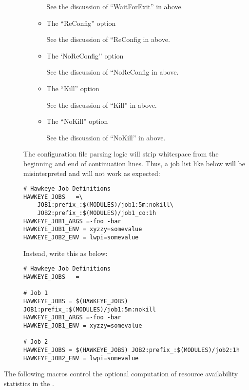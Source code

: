 \begin{description}
\begin{itemize}
\begin{itemize}
	See the discussion of ``WaitForExit'' in
	 above.

	\item The ``ReConfig'' option

	See the discussion of ``ReConfig in
	 above.

	\item The `NoReConfig'' option

	See the discussion of ``NoReConfig in
	 above.

	\item The ``Kill'' option

	See the discussion of ``Kill'' in
	 above.

	\item The ``NoKill'' option

	See the discussion of ``NoKill'' in
	 above.

    \end{itemize}
	
  \end{itemize}
\Note The configuration file parsing logic will strip whitespace from
the beginning and end of continuation lines.  Thus, a job list like
below will be misinterpreted and will not work as expected:
\begin{verbatim}
# Hawkeye Job Definitions
HAWKEYE_JOBS   =\
    JOB1:prefix_:$(MODULES)/job1:5m:nokill\
    JOB2:prefix_:$(MODULES)/job1_co:1h
HAWKEYE_JOB1_ARGS =-foo -bar
HAWKEYE_JOB1_ENV = xyzzy=somevalue
HAWKEYE_JOB2_ENV = lwpi=somevalue
\end{verbatim}
Instead, write this as below:
\begin{verbatim}
# Hawkeye Job Definitions
HAWKEYE_JOBS   =

# Job 1
HAWKEYE_JOBS = $(HAWKEYE_JOBS) JOB1:prefix_:$(MODULES)/job1:5m:nokill
HAWKEYE_JOB1_ARGS =-foo -bar
HAWKEYE_JOB1_ENV = xyzzy=somevalue

# Job 2
HAWKEYE_JOBS = $(HAWKEYE_JOBS) JOB2:prefix_:$(MODULES)/job2:1h
HAWKEYE_JOB2_ENV = lwpi=somevalue
\end{verbatim}


\end{description}

The following macros control the optional computation of resource
availability statistics in the .

